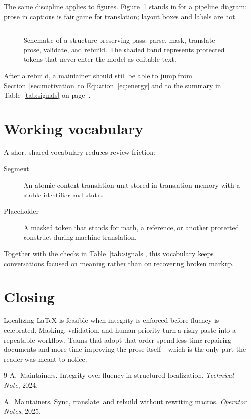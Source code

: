 \documentclass[11pt]{article}
\newcommand{\ctu}{content translation unit}
\begin{document}
The same discipline applies to figures. Figure~\ref{fig:pipeline} stands in
for a pipeline diagram: prose in captions is fair game for translation;
layout boxes and labels are not.

\begin{figure}[ht]
  \centering
  \rule{0.72\linewidth}{2.4cm}
  \caption{Schematic of a structure-preserving pass: parse, mask, translate
    prose, validate, and rebuild. The shaded band represents protected
    tokens that never enter the model as editable text.}
  \label{fig:pipeline}
\end{figure}

After a rebuild, a maintainer should still be able to jump from
Section~\ref{sec:motivation} to Equation~\eqref{eq:energy} and to the summary
in Table~\ref{tab:signals} on page~\pageref{tab:signals}.

\section{Working vocabulary}
\label{sec:vocab}

A short shared vocabulary reduces review friction:

\begin{description}
  \item[Segment] An atomic \ctu{} stored in translation memory with a stable
    identifier and status.
  \item[Placeholder] A masked token that stands for math, a reference, or
    another protected construct during machine translation.
\end{description}

Together with the checks in Table~\ref{tab:signals}, this vocabulary keeps
conversations focused on meaning rather than on recovering broken markup.

\section{Closing}
\label{sec:close}

Localizing \LaTeX{} is feasible when integrity is enforced before fluency is
celebrated. Masking, validation, and human priority turn a risky paste into
a repeatable workflow. Teams that adopt that order spend less time repairing
documents and more time improving the prose itself---which is the only part
the reader was meant to notice.

\begin{thebibliography}{9}
  A.~Maintainers.
  \newblock Integrity over fluency in structured localization.
  \newblock \emph{Technical Note}, 2024.

  A.~Maintainers.
  \newblock Sync, translate, and rebuild without rewriting macros.
  \newblock \emph{Operator Notes}, 2025.
\end{thebibliography}
\end{document}
